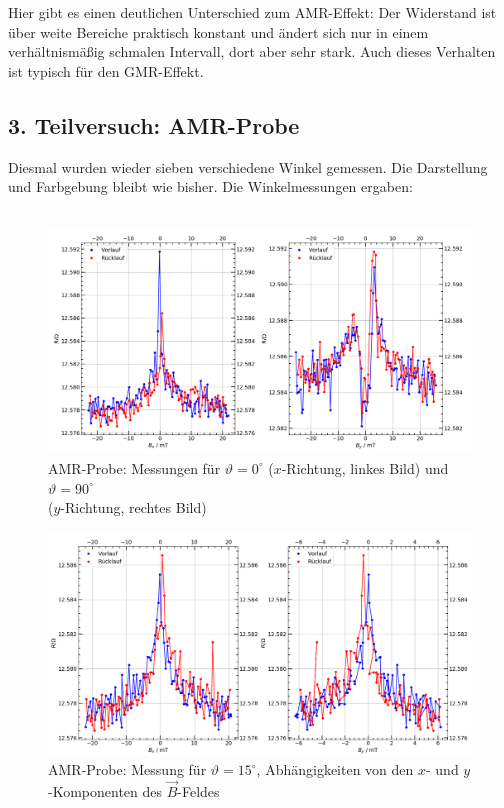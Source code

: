 \documentclass[german,  %
parskip=full,  %
]{scrartcl}
\begin{document}
Hier gibt es einen deutlichen Unterschied zum AMR-Effekt: Der Widerstand ist über weite Bereiche praktisch konstant und ändert sich nur in einem verhältnismäßig schmalen Intervall, dort aber sehr stark. Auch dieses Verhalten ist typisch für den GMR-Effekt.
\subsection{3. Teilversuch: AMR-Probe}
Diesmal wurden wieder sieben verschiedene Winkel gemessen. Die Darstellung und Farbgebung bleibt wie bisher. Die Winkelmessungen ergaben: \\\\
\begin{figure}[h!]\centering
\includegraphics[width=\textwidth]{Probe3_0_und_90_Grad.png}
\caption{AMR-Probe: Messungen für \(\vartheta=0^{\circ}\) (\(x\)-Richtung, linkes Bild) und \(\vartheta=90^{\circ}\) \\ (\(y\)-Richtung, rechtes Bild)}
\end{figure} 
\begin{figure}[h!]\centering
\includegraphics[width=\textwidth]{Probe3_15_Grad.png}
\caption{AMR-Probe: Messung für \(\vartheta=15^{\circ}\), Abhängigkeiten von den \(x\)- und \(y\)-Komponenten des \(\vec{B}\)-Feldes}
\end{figure} 
\end{document}
